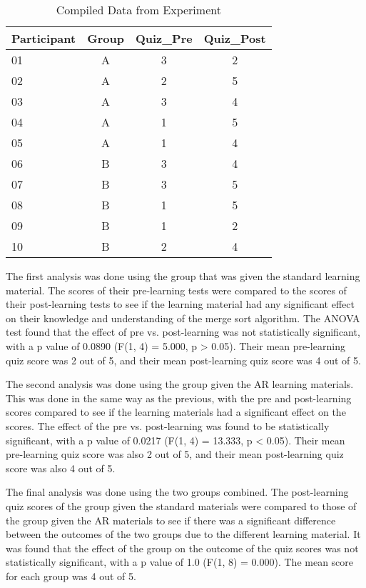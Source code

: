 \documentclass[sigconf]{acmart}
\begin{document}
\begin{table}
    \caption{Compiled Data from Experiment}
    \label{tab:quiz}
    \begin{tabular}{ l|c|c|c }
        \hline
        Participant & Group & Quiz\_Pre & Quiz\_Post \\
        \hline
        01 & A & 3 & 2 \\
        02 & A & 2 & 5 \\
        03 & A & 3 & 4 \\
        04 & A & 1 & 5 \\
        05 & A & 1 & 4 \\
        06 & B & 3 & 4 \\
        07 & B & 3 & 5 \\
        08 & B & 1 & 5 \\
        09 & B & 1 & 2 \\
        10 & B & 2 & 4 \\
    \end{tabular}
\end{table}

The first analysis was done using the group that was given the standard learning material. The scores of their pre-learning tests were compared to the scores of their post-learning tests to see if the learning material had any significant effect on their knowledge and understanding of the merge sort algorithm. The ANOVA test found that the effect of pre vs. post-learning was not statistically significant, with a p value of 0.0890 (F(1, 4) = 5.000, p > 0.05). Their mean pre-learning quiz score was 2 out of 5, and their mean post-learning quiz score was 4 out of 5.

The second analysis was done using the group given the AR learning materials. This was done in the same way as the previous, with the pre and post-learning scores compared to see if the learning materials had a significant effect on the scores. The effect of the pre vs. post-learning was found to be statistically significant, with a p value of 0.0217 (F(1, 4) = 13.333, p < 0.05). Their mean pre-learning quiz score was also 2 out of 5, and their mean post-learning quiz score was also 4 out of 5.

The final analysis was done using the two groups combined. The post-learning quiz scores of the group given the standard materials were compared to those of the group given the AR materials to see if there was a significant difference between the outcomes of the two groups due to the different learning material. It was found that the effect of the group on the outcome of the quiz scores was not statistically significant, with a p value of 1.0 (F(1, 8) = 0.000). The mean score for each group was 4 out of 5.
\end{document}
